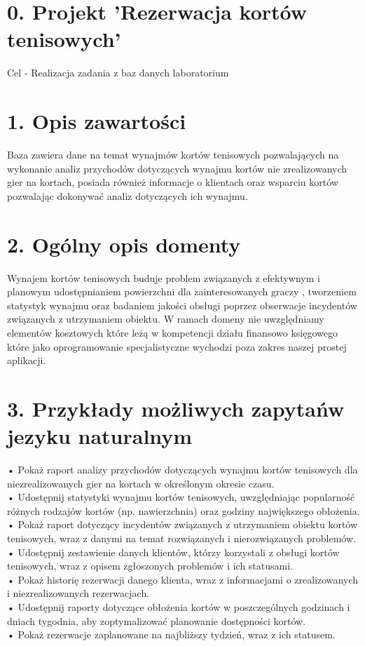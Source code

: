 \documentclass{article}
\begin{document}
\section*{0. Projekt 'Rezerwacja kortów tenisowych'}
Cel - Realizacja zadania z baz danych  laboratorium 

\section*{1. Opis zawartości}

Baza zawiera dane na temat wynajmów kortów tenisowych pozwalających na wykonanie analiz przychodów dotyczących wynajmu kortów nie zrealizowanych gier na kortach, posiada również informacje o klientach oraz wsparciu kortów pozwalając dokonywać analiz dotyczących ich wynajmu.


\section*{2. Ogólny opis domenty}

Wynajem kortów tenisowych buduje problem  związanych z efektywnym i planowym udostępnianiem powierzchni dla zainteresowanych graczy , tworzeniem statystyk wynajmu oraz badaniem jakości obsługi poprzez obserwacje incydentów związanych z utrzymaniem obiektu.
W ramach domeny nie uwzględniamy elementów kosztowych  które leżą w kompetencji działu finansowo księgowego które jako oprogramowanie specjalistyczne  wychodzi poza zakres naszej prostej aplikacji.


\section*{3. Przykłady możliwych zapytańw jezyku naturalnym}

\noindent

•	Pokaż raport analizy przychodów dotyczących wynajmu kortów tenisowych dla niezrealizowanych gier na kortach w określonym okresie czasu.\\
•	Udostępnij statystyki wynajmu kortów tenisowych, uwzględniając popularność różnych rodzajów kortów (np. nawierzchnia) oraz godziny największego obłożenia.\\
•	Pokaż raport dotyczący incydentów związanych z utrzymaniem obiektu kortów tenisowych, wraz z danymi na temat rozwiązanych i nierozwiązanych problemów.\\
•	Udostępnij zestawienie danych klientów, którzy korzystali z obsługi kortów tenisowych, wraz z opisem zgłoszonych problemów i ich statusami.\\
•	Pokaż historię rezerwacji danego klienta, wraz z informacjami o zrealizowanych i niezrealizowanych rezerwacjach.\\
•	Udostępnij raporty dotyczące obłożenia kortów w poszczególnych godzinach i dniach tygodnia, aby zoptymalizować planowanie dostępności kortów.\\
•	Pokaż rezerwacje zaplanowane na najbliższy tydzień, wraz z ich statusem.
\end{document}
